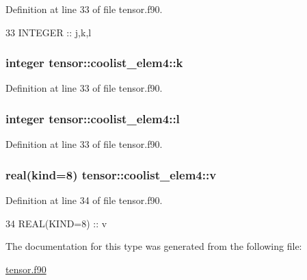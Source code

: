 Definition at line 33 of file tensor.\+f90.


\begin{DoxyCode}
33      \textcolor{keywordtype}{INTEGER} :: j,k,l
\end{DoxyCode}
\subsubsection[{\texorpdfstring{k}{k}}]{\setlength{\rightskip}{0pt plus 5cm}integer tensor\+::coolist\+\_\+elem4\+::k\hspace{0.3cm}{\ttfamily [private]}}\hypertarget{structtensor_1_1coolist__elem4_a35a78377b28244593838a528944d073a}{}\label{structtensor_1_1coolist__elem4_a35a78377b28244593838a528944d073a}


Definition at line 33 of file tensor.\+f90.

\subsubsection[{\texorpdfstring{l}{l}}]{\setlength{\rightskip}{0pt plus 5cm}integer tensor\+::coolist\+\_\+elem4\+::l\hspace{0.3cm}{\ttfamily [private]}}\hypertarget{structtensor_1_1coolist__elem4_a6ced083fe66923e717f1f91ed6f208b4}{}\label{structtensor_1_1coolist__elem4_a6ced083fe66923e717f1f91ed6f208b4}


Definition at line 33 of file tensor.\+f90.

\subsubsection[{\texorpdfstring{v}{v}}]{\setlength{\rightskip}{0pt plus 5cm}real(kind=8) tensor\+::coolist\+\_\+elem4\+::v\hspace{0.3cm}{\ttfamily [private]}}\hypertarget{structtensor_1_1coolist__elem4_af68e0b1bb3ed0bbf0c135d4fc7475aba}{}\label{structtensor_1_1coolist__elem4_af68e0b1bb3ed0bbf0c135d4fc7475aba}


Definition at line 34 of file tensor.\+f90.


\begin{DoxyCode}
34      \textcolor{keywordtype}{REAL(KIND=8)} :: v
\end{DoxyCode}


The documentation for this type was generated from the following file\+:\begin{DoxyCompactItemize}
\item 
\hyperlink{tensor_8f90}{tensor.\+f90}\end{DoxyCompactItemize}
